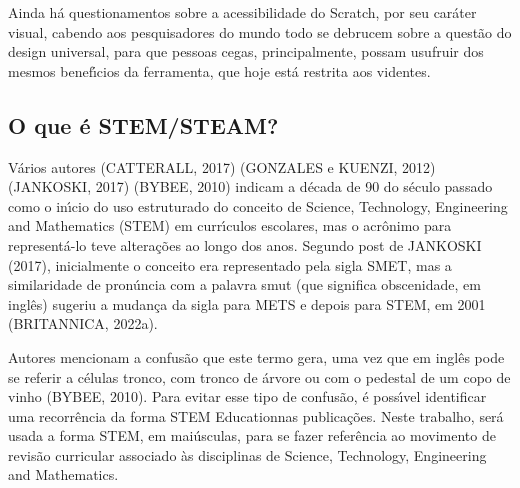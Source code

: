 \documentclass[
12pt,		%
openright,	%
twoside,  %
a4paper,			%
chapter=TITLE,		%
english,			%
french,				%
spanish,			%
brazil				%
]{USPSC-classe/USPSC}
\begin{document}
Ainda h\'a questionamentos sobre a acessibilidade do Scratch, por seu car\'ater visual, cabendo aos pesquisadores do mundo todo se debrucem sobre a quest\~ao do design universal, para que pessoas cegas, principalmente, possam usufruir dos mesmos benef\'{\i}cios da ferramenta, que hoje est\'a restrita aos videntes.

















\subsection[O que \'e STEM/STEAM?]{O que \'e STEM/STEAM?}\label{O que \'e STEM/STEAM?}
V\'arios autores (CATTERALL, 2017)  (GONZALES e KUENZI, 2012)  (JANKOSKI, 2017)  (BYBEE, 2010) indicam a d\'ecada de 90 do s\'eculo passado como o in\'{\i}cio do uso estruturado do conceito de Science, Technology, Engineering and Mathematics (STEM) em curr\'{\i}culos escolares, mas o acr\^onimo para represent\'a-lo teve altera\c{c}\~oes ao longo dos anos. 
Segundo post de  JANKOSKI (2017), inicialmente o conceito era representado pela sigla SMET, mas a similaridade de pron\'uncia com a palavra \textquotedbl smut (que significa obscenidade, em ingl\^es) sugeriu a mudan\c{c}a da sigla para METS e depois para STEM, em 2001  (BRITANNICA, 2022a).

















Autores mencionam a confus\~ao que este termo gera, uma vez que em ingl\^es pode se referir a c\'elulas tronco, com tronco de \'arvore ou com o pedestal de um copo de vinho  (BYBEE, 2010). Para evitar esse tipo de confus\~ao, \'e poss\'{\i}vel identificar uma recorr\^encia da forma \textquotedbl STEM Education\textquotedbl  nas publica\c{c}\~oes. Neste trabalho, ser\'a usada a forma STEM, em mai\'usculas, para se fazer refer\^encia ao movimento de revis\~ao curricular associado \`as disciplinas de \textquotedbl Science, Technology, Engineering and Mathematics.
\end{document}
